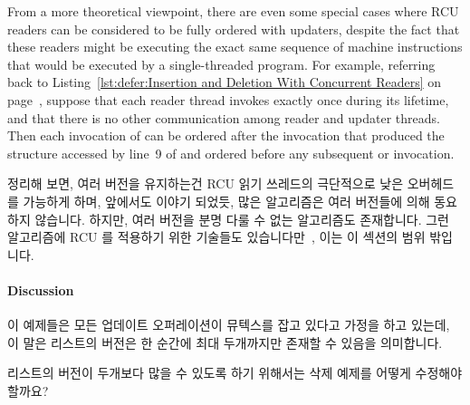 From a more theoretical viewpoint, there are even some special cases where
RCU readers can be considered to be fully ordered with updaters, despite
the fact that these readers might be executing the exact same sequence of
machine instructions that would be executed by a single-threaded program.
For example, referring back to
Listing~\ref{lst:defer:Insertion and Deletion With Concurrent Readers}
on page~\pageref{lst:defer:Insertion and Deletion With Concurrent Readers},
suppose that each reader thread invokes  exactly
once during its lifetime, and that there is no other communication among
reader and updater threads.
Then each invocation of  can be ordered after the
 invocation that produced the  structure
accessed by line~9 of  and ordered before any subsequent
 or  invocation.
\fi

정리해 보면, 여러 버전을 유지하는건 RCU 읽기 쓰레드의 극단적으로 낮은
오버헤드를 가능하게 하며, 앞에서도 이야기 되었듯, 많은 알고리즘은 여러 버전들에
의해 동요하지 않습니다.
하지만, 여러 버전을 분명 다룰 수 없는 알고리즘도 존재합니다.
그런 알고리즘에 RCU 를 적용하기 위한 기술들도
있습니다만~\cite{PaulEdwardMcKenneyPhD}, 이는 이 섹션의 범위 밖입니다.

\paragraph{Discussion}
\label{sec:defer:Discussion}

이 예제들은 모든 업데이트 오퍼레이션이 뮤텍스를 잡고 있다고 가정을 하고 있는데,
이 말은 리스트의 버전은 한 순간에 최대 두개까지만 존재할 수 있음을 의미합니다.

\QuickQuiz{}
	리스트의 버전이 두개보다 많을 수 있도록 하기 위해서는 삭제 예제를
	어떻게 수정해야 할까요?
	\iffalse

